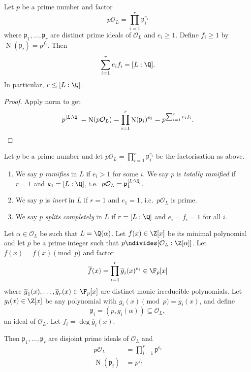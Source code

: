 \documentclass[a4paper]{article}
\renewcommand*{\O}{\mathcal{O}}
\DeclareMathOperator{\n}{N}
\newcommand*{\red}[1]{\overline{#1}} %
\begin{document}
\begin{lemma}
  Let \(p\) be a prime number and factor
  \[
    p \O_L = \prod_{i = 1}^r \mathfrak{p}_i^{e_i}
  \]
  where \(\mathfrak{p}_1, \dots, \mathfrak{p}_r\) are distinct prime ideals of \(\O_L\) and \(e_i \geq 1\). Define \(f_i \geq 1\) by \(\n(\mathfrak{p}_i) = p^{f_i}\). Then
  \[
    \sum_{i = 1}^r e_if_i = [L:\Q].
  \]
  In particular, \(r \leq [L:\Q]\).
\end{lemma}

\begin{proof}
  Apply norm to get
  \[
    p^{[L:\Q]} = \n(p\O_L) = \prod_{i = 1}^r \n(\mathfrak{p}_i)^{e_1} = p^{\sum_{i = 1}^r e_if_i}.
  \]
\end{proof}

\begin{definition}[Ramification]
  Let \(p\) be a prime number and let \(p\O_L = \prod_{i = 1}^r \mathfrak{p}_i^{e_i}\) be the factorisation as above.
  \begin{enumerate}
  \item We say \(p\) \emph{ramifies} in \(L\) if \(e_i > 1\) for some \(i\). We say \(p\) is \emph{totally ramified} if \(r = 1\) and \(e_1 = [L:\Q]\), i.e.\ \(p\O_L = \mathfrak{p}_1^{[L:\Q]}\).
  \item We say \(p\) is \emph{inert} in \(L\) if \(r = 1\) and \(e_1 = 1\), i.e.\ \(p\O_L\) is prime.
  \item We say \(p\) \emph{splits completely} in \(L\) if \(r = [L:\Q]\) and \(e_i = f_i = 1\) for all \(i\).
  \end{enumerate}
\end{definition}

\begin{theorem}
  \label{thm:Dedekind}
  Let \(\alpha \in \O_L\) be such that \(L = \Q(\alpha)\). Let \(f(x) \in \Z[x]\) be its minimal polynomial and let \(p\) be a prime integer such that \(p \ndivides [\O_L:\Z[\alpha]]\). Let \(\red f(x) = f(x) \pmod p\) and factor
  \[
    \red f(x) = \prod_{i = 1}^r \red g_i(x)^{e_i} \in \F_p[x]
  \]
  where \(\red g_1(x), \dots, \red g_r(x) \in \F_p[x]\) are distinct monic irreducible polynomials. Let \(g_i(x) \in \Z[x]\) be any polynomial with \(g_i(x) \pmod p = \red g_i(x)\), and define
  \[
    \mathfrak{p}_i = (p, g_i(\alpha)) \subseteq \O_L,
  \]
  an ideal of \(\O_L\). Let \(f_i = \deg \red g_i(x)\).

  Then \(\mathfrak{p}_1, \dots, \mathfrak{p}_r\) are disjoint prime ideals of \(\O_L\) and
  \begin{align*}
    p\O_L &= \prod_{i = 1}^r \mathfrak{p}^{e_i} \\
    \n(\mathfrak{p}_i) &= p^{f_i}
  \end{align*}
\end{theorem}
\end{document}
